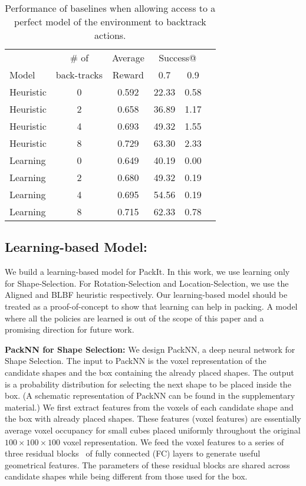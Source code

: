 \documentclass{article}
\begin{document}
\begin{table}[t]
    \centering
    \begin{center}
    \begin{tabular}{l||c|c|ccc}
    \hline
          & $\#$ of & Average & \multicolumn{2}{c}{Success@}  \\
    Model  & back-tracks & Reward  & 0.7 & 0.9 \\
     \hline \hline
    Heuristic & 0 & 0.592 & 22.33 & 0.58 \\
    Heuristic & 2 & 0.658 & 36.89 & 1.17 \\
    Heuristic & 4 & 0.693 & 49.32 & 1.55 \\
    Heuristic & 8 & 0.729 & 63.30 & 2.33 \\
    \hline
    Learning  & 0 & 0.649 & 40.19 & 0.00 \\
    Learning  & 2 & 0.680 & 49.32 & 0.19 \\
    Learning  & 4 & 0.695 & 54.56 & 0.19 \\
    Learning  & 8 & 0.715 & 62.33 & 0.78 \\
    \hline
    \end{tabular}
    \end{center}
    \caption{Performance of baselines when allowing access to a perfect model of the environment to backtrack actions{\footnotemark[3]}.}
    \label{tab:backtrack}
\end{table}
\subsection{Learning-based Model:}
We build a learning-based model for PackIt. In this work, we use learning only for Shape-Selection. For Rotation-Selection and Location-Selection, we use the Aligned and BLBF heuristic respectively. Our learning-based model should be treated as a proof-of-concept to show that learning can help in packing. A model where all the policies are learned is out of the scope of this paper and a promising direction for future work. 

\noindent\textbf{PackNN for Shape Selection:} We design PackNN, a deep neural network for Shape Selection. The input to PackNN is the voxel representation of the candidate shapes and the box containing the already placed shapes. The output is a probability distribution for selecting the next shape to be placed inside the box. (A schematic representation of PackNN can be found in the supplementary material.) We first extract features from the voxels of each candidate shape and the box with already placed shapes. These features (voxel features) are essentially average voxel occupancy for small cubes placed uniformly throughout the original $100 \times 100 \times 100$ voxel representation. We feed the voxel features to a series of three residual blocks~\cite{he2016deep} of fully connected (FC) layers to generate useful geometrical features. The parameters of these residual blocks are shared across candidate shapes while being different from those used for the box. 
\end{document}
